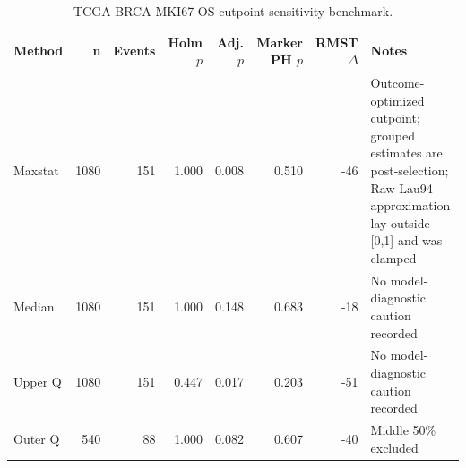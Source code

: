 \begin{table}[t]
\centering
\caption{TCGA-BRCA MKI67 OS cutpoint-sensitivity benchmark.}
\label{tab:brca-mki67-os-cutpoints}
\begin{tabular}{lrrrrrrl}
\toprule
Method & n & Events & Holm $p$ & Adj. $p$ & Marker PH $p$ & RMST $\Delta$ & Notes \\
\midrule
Maxstat & 1080 & 151 & 1.000 & 0.008 & 0.510 & -46 & Outcome-optimized cutpoint; grouped estimates are post-selection; Raw Lau94 approximation lay outside [0,1] and was clamped \\
Median & 1080 & 151 & 1.000 & 0.148 & 0.683 & -18 & No model-diagnostic caution recorded \\
Upper Q & 1080 & 151 & 0.447 & 0.017 & 0.203 & -51 & No model-diagnostic caution recorded \\
Outer Q & 540 & 88 & 1.000 & 0.082 & 0.607 & -40 & Middle 50\% excluded \\
\bottomrule
\end{tabular}
\end{table}
